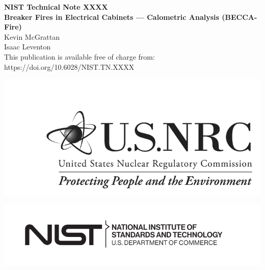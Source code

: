 \documentclass[12pt]{article}
\newcommand{\pubnumber}{XXXX}
\newcommand{\DOI}{https://doi.org/10.6028/NIST.TN.XXXX}
\begin{document}
	
	\begin{titlepage}
		\begin{flushright}
\LARGE{\textbf{NIST Technical Note \pubnumber}}\\
\vfill
\Huge{\textbf{Breaker Fires in Electrical Cabinets --- Calometric Analysis (BECCA-Fire)}}\\
\vfill
\large Kevin McGrattan \\ Isaac Leventon \\
\vfill
\normalsize This publication is available free of charge from:\\
\DOI\\
\vfill

\includegraphics[width=0.5\linewidth]{../FIGURES/NRC_logo} %

\vspace{0.5in}

\includegraphics[width=0.3\linewidth]{../FIGURES/NIST-logo}\\


\end{flushright}
\end{titlepage}
\end{document}
